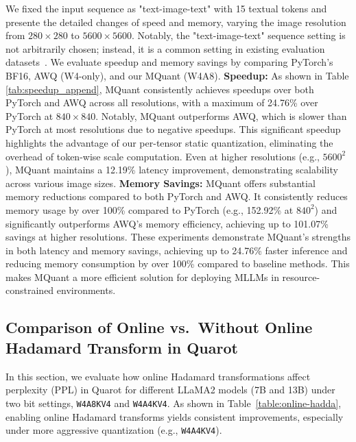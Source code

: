 We fixed the input sequence as "text-image-text" with 15 textual tokens and presente the detailed changes of speed and memory, varying the image resolution from $280\times280$ to $5600\times5600$. Notably, the "text-image-text" sequence setting is not arbitrarily chosen; instead, it is a common setting in existing evaluation datasets~\citep{duan2024vlmevalkit}. We evaluate speedup and memory savings by comparing PyTorch's BF16, AWQ (W4-only), and our MQuant (W4A8). \textbf{Speedup:} As shown in Table \ref{tab:speedup_append}, MQuant consistently achieves speedups over both PyTorch and AWQ across all resolutions, with a maximum of 24.76\% over PyTorch at $840\times 840$. Notably, MQuant outperforms AWQ, which is slower than PyTorch at most resolutions due to negative speedups. This significant speedup highlights the advantage of our per-tensor static quantization, eliminating the overhead of token-wise scale computation. Even at higher resolutions (e.g., $5600^2$), MQuant maintains a 12.19\% latency improvement, demonstrating scalability across various image sizes. \textbf{Memory Savings:} MQuant offers substantial memory reductions compared to both PyTorch and AWQ. It consistently reduces memory usage by over 100\% compared to PyTorch (e.g., 152.92\% at $840^2$) and significantly outperforms AWQ's memory efficiency, achieving up to 101.07\% savings at higher resolutions. These experiments demonstrate MQuant's strengths in both latency and memory savings, achieving up to 24.76\% faster inference and reducing memory consumption by over 100\% compared to baseline methods. This makes MQuant a more efficient solution for deploying MLLMs in resource-constrained environments.


\subsection{Comparison of Online vs.\ Without Online Hadamard Transform in Quarot}
\label{sec:online-hadamard}

In this section, we evaluate how online Hadamard transformations affect perplexity (PPL) in Quarot for different LLaMA2 models (7B and 13B) under two bit settings, \texttt{W4A8KV4} and \texttt{W4A4KV4}. As shown in Table~\ref{table:online-hadda}, enabling online Hadamard transforms yields consistent improvements, especially under more aggressive quantization (e.g., \texttt{W4A4KV4}).

